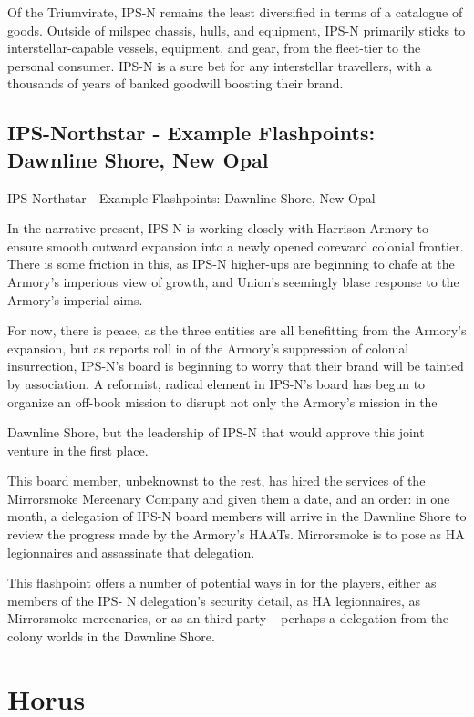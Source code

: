 Of the Triumvirate, IPS-N remains the least diversified in terms of a catalogue of goods. Outside
of milspec chassis, hulls, and equipment, IPS-N primarily sticks to interstellar-capable vessels,
equipment, and gear, from the fleet-tier to the personal consumer. IPS-N is a sure bet for any
interstellar travellers, with a thousands of years of banked goodwill boosting their brand.

\subsection{IPS-Northstar - Example Flashpoints: Dawnline Shore, New Opal  }
IPS-Northstar - Example Flashpoints: Dawnline Shore, New Opal

In the narrative present, IPS-N is working closely with Harrison Armory to ensure smooth
outward expansion into a newly opened coreward colonial frontier. There is some friction in this,
as IPS-N higher-ups are beginning to chafe at the Armory’s imperious view of growth, and
Union’s seemingly blase response to the Armory’s imperial aims.


For now, there is peace, as the three entities are all benefitting from the Armory’s expansion, but
as reports roll in of the Armory’s suppression of colonial insurrection, IPS-N’s board is beginning
to worry that their brand will be tainted by association. A reformist, radical element in IPS-N’s
board has begun to organize an off-book mission to disrupt not only the Armory’s mission in the




Dawnline Shore, but the leadership of IPS-N that would approve this joint venture in the first
place.


This board member, unbeknownst to the rest, has hired the services of the Mirrorsmoke
Mercenary Company and given them a date, and an order: in one month, a delegation of IPS-N
board members will arrive in the Dawnline Shore to review the progress made by the Armory’s
HAATs. Mirrorsmoke is to pose as HA legionnaires and assassinate that delegation.


This flashpoint offers a number of potential ways in for the players, either as members of the IPS-
N delegation’s security detail, as HA legionnaires, as Mirrorsmoke mercenaries, or as an third
party -- perhaps a delegation from the colony worlds in the Dawnline Shore.


\section{Horus}


